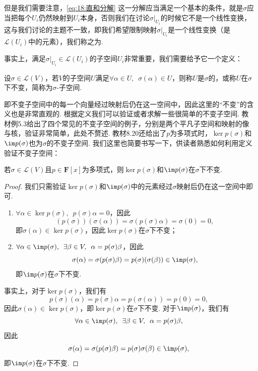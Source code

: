 但是我们需要注意，\autoref{eq:18:直和分解} 这一分解应当满足一个基本的条件，就是$\sigma$应当把每个$U_i$仍然映射到$U_i$本身，否则我们在讨论$\sigma\vert_{U_i}$的时候它不是一个线性变换，这与我们讨论的主题不一致，即我们希望限制映射$\sigma\vert_{U_i}$是一个线性变换（是$\mathcal{L}(U_i)$中的元素），我们称之为.

事实上，满足$\sigma\vert_{U_i}\in\mathcal{L}(U_i)$的子空间$U_i$非常重要，我们需要给予它一个定义：
\begin{definition}
    设$\sigma\in \mathcal{L}(V)$，若$V$的子空间$U$满足$\forall \alpha\in U,\enspace \sigma(\alpha)\in U$，则称$U$是$\sigma$的，或称$U$在$\sigma$下不变，简称为$\sigma$-子空间.
\end{definition}
即不变子空间中的每一个向量经过映射后仍在这一空间中，因此这里的``不变''的含义也是非常直观的. 根据定义我们可以验证或者求解一些很简单的不变子空间. 教材例5.3给出了四个常见的不变子空间的例子，分别是两个平凡子空间和映射的像与核，验证非常简单，此处不赘述. 教材8.20还给出了$p$为多项式时，$\ker p(\sigma)$和$\im p(\sigma)$也为$\sigma$的不变子空间. 我们这里也简要书写一下，供读者熟悉如何利用定义验证不变子空间：
\begin{example}
    若$\sigma\in\mathcal{L}(V)$且$p\in\mathbf{F}[x]$为多项式，则$\ker p(\sigma)$和$\im p(\sigma)$在$\sigma$下不变.
\end{example}

\begin{proof}
    我们只需验证$\ker p(\sigma)$和$\im p(\sigma)$中的元素经过$\sigma$映射后仍在这一空间中即可.
    \begin{enumerate}
        \item $\forall \alpha\in \ker p(\sigma),\enspace p(\sigma)\alpha=0$，因此
              \[(p(\sigma))(\sigma(\alpha))=\sigma(p(\sigma)\alpha)=\sigma(0)=0,\]
              即$\sigma(\alpha)\in \ker p(\sigma)$，因此$\ker p(\sigma)$在$\sigma$下不变；

        \item $\forall \alpha\in \im p(\sigma),\enspace \exists \beta\in V,\enspace \alpha=p(\sigma)\beta$，因此
              \[\sigma(\alpha)=\sigma(p(\sigma)\beta)=p(\sigma)(\sigma(\beta))\in \im p(\sigma),\]
              即$\im p(\sigma)$在$\sigma$下不变.
    \end{enumerate}
    事实上，对于$\ker p(\sigma)$，我们有
    \[ p(\sigma)(\alpha)=p(\sigma)\alpha=p(\sigma(\alpha))=p(0)=0,\]
    因此$\sigma(\alpha)\in \ker p(\sigma)$，即$\ker p(\sigma)$在$\sigma$下不变. 对于$\im p(\sigma)$，我们有
    \[\forall \alpha\in \im p(\sigma),\enspace \exists \beta\in V,\enspace \alpha=p(\sigma)\beta,\]
    因此
    \[\sigma(\alpha)=\sigma(p(\sigma)\beta)=p(\sigma)\sigma(\beta)\in \im p(\sigma),\]
    即$\im p(\sigma)$在$\sigma$下不变.
\end{proof}


